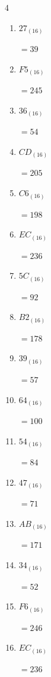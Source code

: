 \begin{multicols}{4}
\begin{enumerate}
  \item $27_{(16)}$

        $=39$

  \item $F5_{(16)}$

        $=245$

  \item $36_{(16)}$

        $=54$

  \item $CD_{(16)}$

        $=205$

  \item $C6_{(16)}$

        $=198$

  \item $EC_{(16)}$

        $=236$

  \item $5C_{(16)}$

        $=92$

\columnbreak %

\resetques

  \item $B2_{(16)}$

        $=178$

  \item $39_{(16)}$

        $=57$

  \item $64_{(16)}$

        $=100$

  \item $54_{(16)}$

        $=84$

  \item $47_{(16)}$

        $=71$

  \item $AB_{(16)}$

        $=171$

  \item $34_{(16)}$

        $=52$

  \item $F6_{(16)}$

        $=246$

  \item $EC_{(16)}$

        $=236$


\end{enumerate}
\end{multicols}
